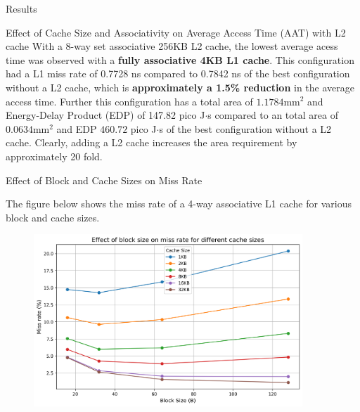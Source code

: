 \begin{section}{Results}
\begin{subsection}{Effect of Cache Size and Associativity on Average Access Time (AAT) with L2 cache}
        With a 8-way set associative 256KB L2 cache, the lowest average acess time was observed with a \textbf{fully associative 4KB L1 cache}. This configuration had a L1 miss rate of 0.7728 ns compared to 0.7842 ns of the best configuration without a L2 cache, which is \textbf{approximately a 1.5\% reduction} in the average access time. Further this configuration has a total area of $1.1784 \text{mm}^2$ and Energy-Delay Product (EDP) of 147.82 pico J$\cdot$s compared to an total area of $0.0634 \text{mm}^2$ and EDP $460.72$ pico J$\cdot$s of the best configuration without a L2 cache. Clearly, adding a L2 cache increases the area requirement by approximately 20 fold.
        
    
    \end{subsection}

   
    \begin{subsection}{Effect of Block and Cache Sizes on Miss Rate}

    The figure below shows the miss rate of a 4-way associative L1 cache for various block and cache sizes.

    \begin{figure}[h!]
        \includegraphics[width=0.9\textwidth]{figures/fig4/fig4.png}
        \centering
        \label{fig:fig4}
    \end{figure}


\end{subsection}
\end{section}

